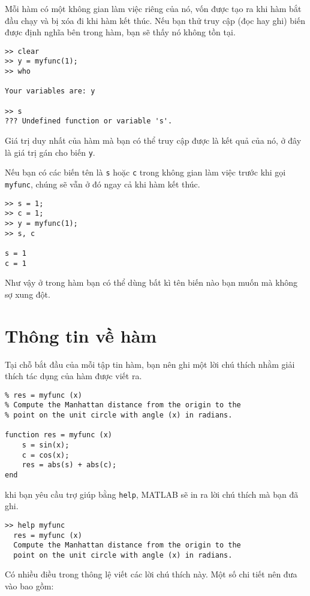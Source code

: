 \documentclass[12pt]{book}
\begin{document}
Mỗi hàm có một không gian làm việc riêng của nó, vốn được tạo ra khi
hàm bắt đầu chạy và bị xóa đi khi hàm kết thúc. Nếu bạn thử 
truy cập (đọc hay ghi) biến được định nghĩa bên trong hàm, bạn sẽ
thấy nó không tồn tại.

\begin{verbatim}
>> clear
>> y = myfunc(1);
>> who

Your variables are: y
  
>> s
??? Undefined function or variable 's'.
\end{verbatim}

Giá trị duy nhất của hàm mà bạn có thể truy cập được là kết quả của
nó, ở đây là giá trị gán cho biến {\tt y}.

Nếu bạn có các biến tên là {\tt s} hoặc {\tt c} trong không gian
làm việc trước khi gọi {\tt myfunc}, chúng sẽ vẫn ở đó ngay cả khi
hàm kết thúc.

\begin{verbatim}
>> s = 1;
>> c = 1;
>> y = myfunc(1);
>> s, c

s = 1
c = 1
\end{verbatim}

Như vậy ở trong hàm bạn có thể dùng bất kì tên biến nào bạn muốn
mà không sợ xung đột.


\section{Thông tin về hàm}

Tại chỗ bắt đầu của mỗi tập tin hàm, bạn nên ghi một lời chú thích
nhằm giải thích tác dụng của hàm được viết ra.

\begin{verbatim}
% res = myfunc (x)
% Compute the Manhattan distance from the origin to the
% point on the unit circle with angle (x) in radians.

function res = myfunc (x)
    s = sin(x);
    c = cos(x);
    res = abs(s) + abs(c);
end
\end{verbatim}

khi bạn yêu cầu trợ giúp bằng {\tt help}, MATLAB sẽ in ra
lời chú thích mà bạn đã ghi.

\begin{verbatim}
>> help myfunc
  res = myfunc (x)
  Compute the Manhattan distance from the origin to the
  point on the unit circle with angle (x) in radians.
\end{verbatim}

Có nhiều điều trong thông lệ viết các lời chú thích này. 
Một số chi tiết nên đưa vào bao gồm:
\end{document}

